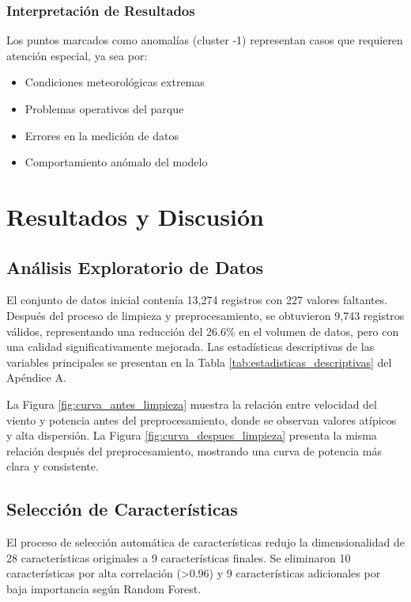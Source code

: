 \documentclass[conference]{IEEEtran}
\begin{document}
	\subsubsection{Interpretación de Resultados}
	Los puntos marcados como anomalías (cluster -1) representan casos que requieren atención especial, ya sea por:
	\begin{itemize}
		\item Condiciones meteorológicas extremas
		\item Problemas operativos del parque
		\item Errores en la medición de datos
		\item Comportamiento anómalo del modelo
	\end{itemize}
	
	\section{Resultados y Discusión}
	
	\subsection{Análisis Exploratorio de Datos}
	El conjunto de datos inicial contenía 13,274 registros con 227 valores faltantes. Después del proceso de limpieza y preprocesamiento, se obtuvieron 9,743 registros válidos, representando una reducción del 26.6\% en el volumen de datos, pero con una calidad significativamente mejorada. Las estadísticas descriptivas de las variables principales se presentan en la Tabla \ref{tab:estadisticas_descriptivas} del Apéndice A.
	
	La Figura \ref{fig:curva_antes_limpieza} muestra la relación entre velocidad del viento y potencia antes del preprocesamiento, donde se observan valores atípicos y alta dispersión. La Figura \ref{fig:curva_despues_limpieza} presenta la misma relación después del preprocesamiento, mostrando una curva de potencia más clara y consistente.
	
	\subsection{Selección de Características}
	El proceso de selección automática de características redujo la dimensionalidad de 28 características originales a 9 características finales. Se eliminaron 10 características por alta correlación (>0.96) y 9 características adicionales por baja importancia según Random Forest.
	
\end{document}

